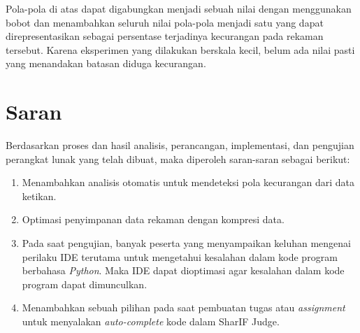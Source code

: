 \begin{enumerate}
	Pola-pola di atas dapat digabungkan menjadi sebuah nilai dengan menggunakan bobot dan menambahkan seluruh nilai pola-pola menjadi satu yang dapat direpresentasikan sebagai persentase terjadinya kecurangan pada rekaman tersebut. Karena eksperimen yang dilakukan berskala kecil, belum ada nilai pasti yang menandakan batasan diduga kecurangan.
\end{enumerate}

\section{Saran}
Berdasarkan proses dan hasil analisis, perancangan, implementasi, dan pengujian perangkat lunak yang telah dibuat, maka diperoleh saran-saran sebagai berikut:

\begin{enumerate}
	\item Menambahkan analisis otomatis untuk mendeteksi pola kecurangan dari data ketikan.
	\item Optimasi penyimpanan data rekaman dengan kompresi data.
	\item Pada saat pengujian, banyak peserta yang menyampaikan keluhan mengenai perilaku IDE terutama untuk mengetahui kesalahan dalam kode program berbahasa \textit{Python}. Maka IDE dapat dioptimasi agar kesalahan dalam kode program dapat dimunculkan.
	\item Menambahkan sebuah pilihan pada saat pembuatan tugas atau \textit{assignment} untuk menyalakan \textit{auto-complete} kode dalam SharIF Judge.
\end{enumerate}